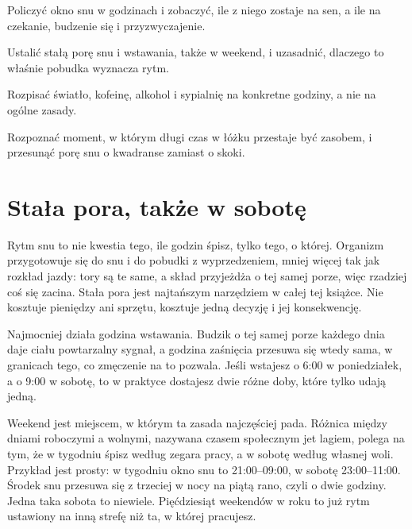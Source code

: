 
\begin{cele}
\item Policzyć okno snu w godzinach i zobaczyć, ile z niego zostaje na sen, a ile na czekanie, budzenie się i przyzwyczajenie.
\item Ustalić stałą porę snu i wstawania, także w weekend, i uzasadnić, dlaczego to właśnie pobudka wyznacza rytm.
\item Rozpisać światło, kofeinę, alkohol i sypialnię na konkretne godziny, a nie na ogólne zasady.
\item Rozpoznać moment, w którym długi czas w łóżku przestaje być zasobem, i przesunąć porę snu o kwadranse zamiast o skoki.
\end{cele}

\section{Stała pora, także w sobotę}

Rytm snu to nie kwestia tego, ile godzin śpisz, tylko tego, o której. Organizm przygotowuje się do snu i do pobudki z wyprzedzeniem, mniej więcej tak jak rozkład jazdy: tory są te same, a skład przyjeżdża o tej samej porze, więc rzadziej coś się zacina. Stała pora jest najtańszym narzędziem w całej tej książce. Nie kosztuje pieniędzy ani sprzętu, kosztuje jedną decyzję i jej konsekwencję.

Najmocniej działa godzina wstawania. Budzik o tej samej porze każdego dnia daje ciału powtarzalny sygnał, a godzina zaśnięcia przesuwa się wtedy sama, w granicach tego, co zmęczenie na to pozwala.  Jeśli wstajesz o 6:00 w poniedziałek, a o 9:00 w sobotę, to w praktyce dostajesz dwie różne doby, które tylko udają jedną.

Weekend jest miejscem, w którym ta zasada najczęściej pada. Różnica między dniami roboczymi a wolnymi, nazywana czasem społecznym jet lagiem, polega na tym, że w tygodniu śpisz według zegara pracy, a w sobotę według własnej woli. Przykład jest prosty: w tygodniu okno snu to 21:00--09:00, w sobotę 23:00--11:00. Środek snu przesuwa się z trzeciej w nocy na piątą rano, czyli o dwie godziny. Jedna taka sobota to niewiele. Pięćdziesiąt weekendów w roku to już rytm ustawiony na inną strefę niż ta, w której pracujesz. 

